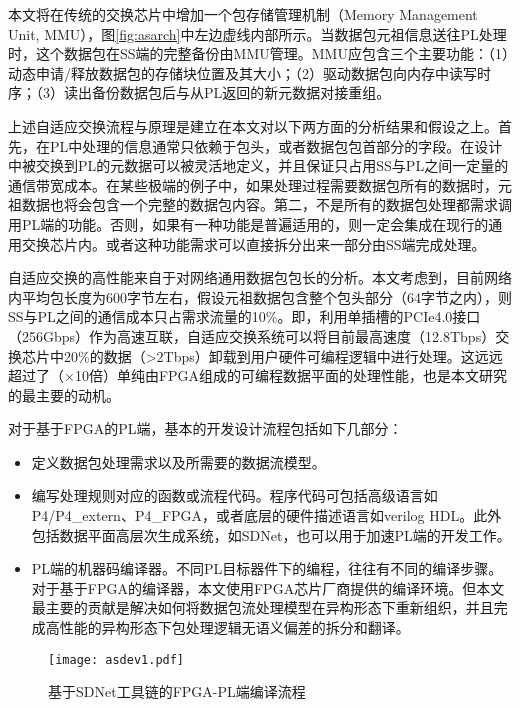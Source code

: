 本文将在传统的交换芯片中增加一个包存储管理机制（Memory Management Unit, MMU），图\ref{fig:asarch}中左边虚线内部所示。当数据包元祖信息送往PL处理时，这个数据包在SS端的完整备份由MMU管理。MMU应包含三个主要功能：（1）动态申请/释放数据包的存储块位置及其大小；（2）驱动数据包向内存中读写时序；（3）读出备份数据包后与从PL返回的新元数据对接重组。

上述自适应交换流程与原理是建立在本文对以下两方面的分析结果和假设之上。首先，在PL中处理的信息通常只依赖于包头，或者数据包包首部分的字段。在设计中被交换到PL的元数据可以被灵活地定义，并且保证只占用SS与PL之间一定量的通信带宽成本。在某些极端的例子中，如果处理过程需要数据包所有的数据时，元祖数据也将会包含一个完整的数据包内容。第二，不是所有的数据包处理都需求调用PL端的功能。否则，如果有一种功能是普遍适用的，则一定会集成在现行的通用交换芯片内。或者这种功能需求可以直接拆分出来一部分由SS端完成处理。

自适应交换的高性能来自于对网络通用数据包包长的分析。本文考虑到，目前网络内平均包长度为600字节左右，假设元祖数据包含整个包头部分（64字节之内），则SS与PL之间的通信成本只占需求流量的10\%。即，利用单插槽的PCIe4.0接口（256Gbps）作为高速互联，自适应交换系统可以将目前最高速度（12.8Tbps）交换芯片中20\%的数据（>2Tbps）卸载到用户硬件可编程逻辑中进行处理。这远远超过了（$\times$10倍）单纯由FPGA组成的可编程数据平面的处理性能，也是本文研究的最主要的动机。

\label{chap432}

对于基于FPGA的PL端，基本的开发设计流程包括如下几部分：

\begin{itemize}
	\item 定义数据包处理需求以及所需要的数据流模型。
	\item 编写处理规则对应的函数或流程代码。程序代码可包括高级语言如P4/P4\_extern、P4\_FPGA，或者底层的硬件描述语言如verilog HDL。此外包括数据平面高层次生成系统，如SDNet，也可以用于加速PL端的开发工作。
	\item PL端的机器码编译器。不同PL目标器件下的编程，往往有不同的编译步骤。对于基于FPGA的编译器，本文使用FPGA芯片厂商提供的编译环境。但本文最主要的贡献是解决如何将数据包流处理模型在异构形态下重新组织，并且完成高性能的异构形态下包处理逻辑无语义偏差的拆分和翻译。
\end{itemize}

\begin{figure}[!ht]
	\centering 
	\vspace{-1.5mm} 
	\texttt{[image: asdev1.pdf]}
	\caption{基于SDNet工具链的FPGA-PL端编译流程} \label{fig:asdev}
\end{figure}

